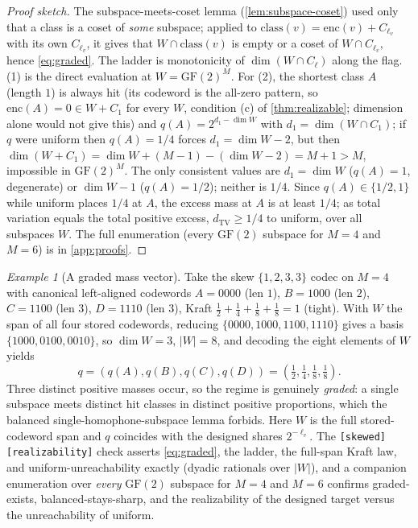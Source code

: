 \documentclass[11pt]{article}
\theoremstyle{definition}
\theoremstyle{plain}
\theoremstyle{remark}
\newtheorem{example}{Example}[section]
\newcommand{\enc}{\mathrm{enc}}
\newcommand{\TV}{d_{\mathrm{TV}}}
\newcommand{\GF}{\mathrm{GF}(2)}
\newcommand{\class}{\mathrm{class}}
\newcommand{\W}{W}                          %
\newcommand{\inter}{\cap}
\begin{document}
\begin{proof}[Proof sketch]
The subspace-meets-coset lemma (\cref{lem:subspace-coset}) used only that a class is a
coset of \emph{some} subspace; applied to $\class(v) = \enc(v) + C_{\ell_v}$ with its own
$C_{\ell_v}$, it gives that $\W \inter \class(v)$ is empty or a coset of $\W \inter
C_{\ell_v}$, hence \eqref{eq:graded}. The ladder is monotonicity of
$\dim(\W \inter C_\ell)$ along the flag. (1) is the direct evaluation at $\W = \GF^M$.
For (2), the shortest class $A$ (length $1$) is always hit (its codeword is the
all-zero pattern, so $\enc(A) = 0 \in \W + C_1$ for every $\W$, condition (c) of
\cref{thm:realizable}; dimension alone would not give this) and $q(A) = 2^{d_1 - \dim \W}$
with $d_1 = \dim(\W \inter C_1)$; if $q$ were uniform then $q(A) = 1/4$ forces $d_1 =
\dim \W - 2$, but then $\dim(\W + C_1) = \dim \W + (M-1) - (\dim \W - 2) = M + 1 > M$,
impossible in $\GF^M$. The only consistent values are $d_1 = \dim \W$ ($q(A) = 1$,
degenerate) or $\dim \W - 1$ ($q(A) = 1/2$); neither is $1/4$. Since $q(A) \in \{1/2, 1\}$
while uniform places $1/4$ at $A$, the excess mass at $A$ is at least $1/4$; as total variation
equals the total positive excess, $\TV \ge 1/4$ to uniform, over all
subspaces $\W$. The full enumeration (every $\GF$ subspace for $M = 4$ and $M = 6$) is in
\cref{app:proofs}.
\end{proof}

\begin{example}[A graded mass vector]
\label{ex:graded}
Take the skew $\{1,2,3,3\}$ codec on $M = 4$ with canonical left-aligned codewords $A =
0000$ (len $1$), $B = 1000$ (len $2$), $C = 1100$ (len $3$), $D = 1110$ (len $3$), Kraft
$\tfrac12 + \tfrac14 + \tfrac18 + \tfrac18 = 1$ (tight). With $\W$ the span of all four
stored codewords, reducing $\{0000, 1000, 1100, 1110\}$ gives a basis $\{1000, 0100,
0010\}$, so $\dim \W = 3$, $|\W| = 8$, and decoding the eight elements of $\W$ yields
\[
  q = (q(A), q(B), q(C), q(D)) = (\tfrac12, \tfrac14, \tfrac18, \tfrac18).
\]
Three distinct positive masses occur, so the regime is genuinely \emph{graded}: a single
subspace meets distinct hit classes in distinct positive proportions, which the balanced
single-homophone-subspace lemma forbids. Here $\W$ is the full stored-codeword span and
$q$ coincides with the designed shares $2^{-\ell_v}$. The \texttt{[skewed][realizability]}
check asserts \eqref{eq:graded}, the ladder, the full-span Kraft law, and uniform-unreachability
exactly (dyadic rationals over $|\W|$), and a companion enumeration over \emph{every}
$\GF$ subspace for $M = 4$ and $M = 6$ confirms graded-exists, balanced-stays-sharp, and
the realizability of the designed target versus the unreachability of uniform.
\end{example}
\end{document}
